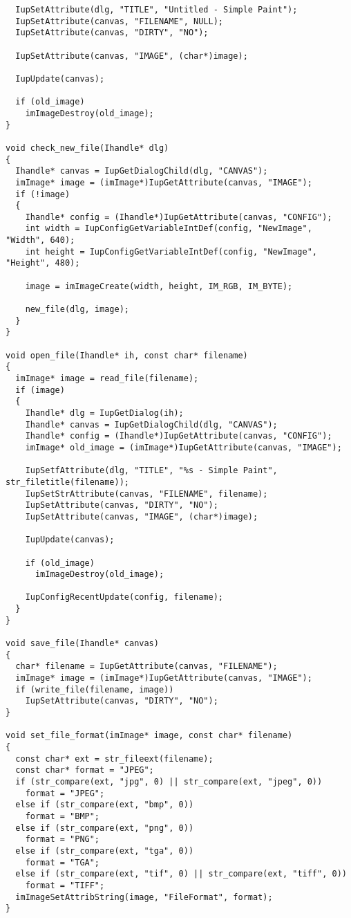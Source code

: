 \documentclass{ctexart}
\begin{document}
\begin{lstlisting}
  IupSetAttribute(dlg, "TITLE", "Untitled - Simple Paint");
  IupSetAttribute(canvas, "FILENAME", NULL);
  IupSetAttribute(canvas, "DIRTY", "NO");

  IupSetAttribute(canvas, "IMAGE", (char*)image);

  IupUpdate(canvas);

  if (old_image)
    imImageDestroy(old_image);
}

void check_new_file(Ihandle* dlg)
{
  Ihandle* canvas = IupGetDialogChild(dlg, "CANVAS");
  imImage* image = (imImage*)IupGetAttribute(canvas, "IMAGE");
  if (!image)
  {
    Ihandle* config = (Ihandle*)IupGetAttribute(canvas, "CONFIG");
    int width = IupConfigGetVariableIntDef(config, "NewImage", "Width", 640);
    int height = IupConfigGetVariableIntDef(config, "NewImage", "Height", 480);

    image = imImageCreate(width, height, IM_RGB, IM_BYTE);

    new_file(dlg, image);
  }
}

void open_file(Ihandle* ih, const char* filename)
{
  imImage* image = read_file(filename);
  if (image)
  {
    Ihandle* dlg = IupGetDialog(ih);
    Ihandle* canvas = IupGetDialogChild(dlg, "CANVAS");
    Ihandle* config = (Ihandle*)IupGetAttribute(canvas, "CONFIG");
    imImage* old_image = (imImage*)IupGetAttribute(canvas, "IMAGE");

    IupSetfAttribute(dlg, "TITLE", "%s - Simple Paint", str_filetitle(filename));
    IupSetStrAttribute(canvas, "FILENAME", filename);
    IupSetAttribute(canvas, "DIRTY", "NO");
    IupSetAttribute(canvas, "IMAGE", (char*)image);

    IupUpdate(canvas);

    if (old_image)
      imImageDestroy(old_image);

    IupConfigRecentUpdate(config, filename);
  }
}

void save_file(Ihandle* canvas)
{
  char* filename = IupGetAttribute(canvas, "FILENAME");
  imImage* image = (imImage*)IupGetAttribute(canvas, "IMAGE");
  if (write_file(filename, image))
    IupSetAttribute(canvas, "DIRTY", "NO");
}

void set_file_format(imImage* image, const char* filename)
{
  const char* ext = str_fileext(filename);
  const char* format = "JPEG";
  if (str_compare(ext, "jpg", 0) || str_compare(ext, "jpeg", 0))
    format = "JPEG";
  else if (str_compare(ext, "bmp", 0))
    format = "BMP";
  else if (str_compare(ext, "png", 0))
    format = "PNG";
  else if (str_compare(ext, "tga", 0))
    format = "TGA";
  else if (str_compare(ext, "tif", 0) || str_compare(ext, "tiff", 0))
    format = "TIFF";
  imImageSetAttribString(image, "FileFormat", format);
}


\end{lstlisting}
\end{document}
